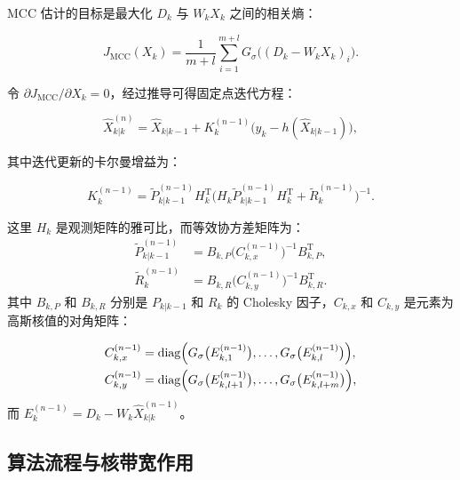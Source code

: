 MCC 估计的目标是最大化 \(D_k\) 与 \(W_k X_k\) 之间的相关熵：

\begin{equation}
    J_{\mathrm{MCC}}(X_k) = \frac{1}{m+l}\sum_{i=1}^{m+l} G_{\sigma}\bigl((D_k - W_k X_k)_i\bigr).
\end{equation}

令 \(\partial J_{\mathrm{MCC}} / \partial X_k = 0\)，经过推导可得固定点迭代方程：

\begin{equation}
    \hat{X}_{k|k}^{(n)} = \hat{X}_{k|k-1} + K_k^{(n-1)}\bigl(y_k - h(\hat{X}_{k|k-1})\bigr),
\end{equation}

其中迭代更新的卡尔曼增益为：

\begin{equation}
    K_k^{(n-1)} = \tilde{P}_{k|k-1}^{(n-1)} H_k^{\mathrm{T}} \bigl( H_k \tilde{P}_{k|k-1}^{(n-1)} H_k^{\mathrm{T}} + \tilde{R}_k^{(n-1)} \bigr)^{-1}.
\end{equation}

这里 \(H_k\) 是观测矩阵的雅可比，而等效协方差矩阵为：
\begin{equation}
    \begin{aligned}
        \tilde{P}_{k|k-1}^{(n-1)} & = B_{k,P} \bigl( C_{k,x}^{(n-1)} \bigr)^{-1} B_{k,P}^{\mathrm{T}}, \\
        \tilde{R}_k^{(n-1)}       & = B_{k,R} \bigl( C_{k,y}^{(n-1)} \bigr)^{-1} B_{k,R}^{\mathrm{T}}.
    \end{aligned}
\end{equation}
其中 \(B_{k,P}\) 和 \(B_{k,R}\) 分别是 \(P_{k|k-1}\) 和 \(R_k\) 的 Cholesky 因子，\(C_{k,x}\) 和 \(C_{k,y}\) 是元素为高斯核值的对角矩阵：

\begin{equation}
    \begin{aligned}
        C_{k,x}^{(n-1)} & = \operatorname{diag}\Bigl(G_{\sigma}\bigl(E_{k,1}^{(n-1)}\bigr), \dots, G_{\sigma}\bigl(E_{k,l}^{(n-1)}\bigr)\Bigr),     \\
        C_{k,y}^{(n-1)} & = \operatorname{diag}\Bigl(G_{\sigma}\bigl(E_{k,l+1}^{(n-1)}\bigr), \dots, G_{\sigma}\bigl(E_{k,l+m}^{(n-1)}\bigr)\Bigr),
    \end{aligned}
\end{equation}
而 \(E_k^{(n-1)} = D_k - W_k \hat{X}_{k|k}^{(n-1)}\)。

\subsection{算法流程与核带宽作用}

